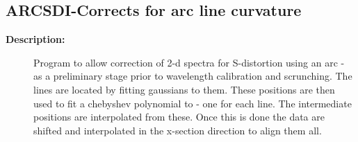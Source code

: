 \subsection{ARCSDI-\label{ARCSDI}Corrects for arc line curvature}
\begin{description}

\item [{\bf Description:}]
   Program to allow correction of 2-d spectra for S-distortion using
   an arc - as a preliminary stage prior to wavelength calibration
   and scrunching.
     The lines are located by fitting gaussians to them.
     These positions are then used to fit a chebyshev polynomial
   to - one for each line. The intermediate positions are interpolated
   from these.
   Once this is done the data are shifted and interpolated in the
   x-section direction to align them all.



\end{description}

